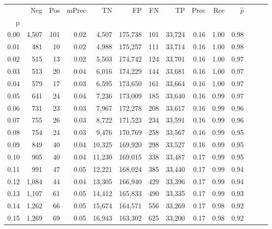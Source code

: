 \begin{tabular}{rrrrrrrrrrrrrr}
\toprule
{} &    Neg &    Pos & mPrec &       TN &       FP &      FN &      TP &  Prec &   Rec & $\hat{p}$ \\
p    &        &        &       &          &          &         &         &       &       &           \\
\midrule
0.00 &  4,507 &    101 &  0.02 &    4,507 &  175,738 &     101 &  33,724 &  0.16 &  1.00 &      0.98 \\
0.01 &    481 &     10 &  0.02 &    4,988 &  175,257 &     111 &  33,714 &  0.16 &  1.00 &      0.98 \\
0.02 &    515 &     13 &  0.02 &    5,503 &  174,742 &     124 &  33,701 &  0.16 &  1.00 &      0.97 \\
0.03 &    513 &     20 &  0.04 &    6,016 &  174,229 &     144 &  33,681 &  0.16 &  1.00 &      0.97 \\
0.04 &    579 &     17 &  0.03 &    6,595 &  173,650 &     161 &  33,664 &  0.16 &  1.00 &      0.97 \\
0.05 &    641 &     24 &  0.04 &    7,236 &  173,009 &     185 &  33,640 &  0.16 &  0.99 &      0.97 \\
0.06 &    731 &     23 &  0.03 &    7,967 &  172,278 &     208 &  33,617 &  0.16 &  0.99 &      0.96 \\
0.07 &    755 &     26 &  0.03 &    8,722 &  171,523 &     234 &  33,591 &  0.16 &  0.99 &      0.96 \\
0.08 &    754 &     24 &  0.03 &    9,476 &  170,769 &     258 &  33,567 &  0.16 &  0.99 &      0.95 \\
0.09 &    849 &     40 &  0.04 &   10,325 &  169,920 &     298 &  33,527 &  0.16 &  0.99 &      0.95 \\
0.10 &    905 &     40 &  0.04 &   11,230 &  169,015 &     338 &  33,487 &  0.17 &  0.99 &      0.95 \\
0.11 &    991 &     47 &  0.05 &   12,221 &  168,024 &     385 &  33,440 &  0.17 &  0.99 &      0.94 \\
0.12 &  1,084 &     44 &  0.04 &   13,305 &  166,940 &     429 &  33,396 &  0.17 &  0.99 &      0.94 \\
0.13 &  1,107 &     61 &  0.05 &   14,412 &  165,833 &     490 &  33,335 &  0.17 &  0.99 &      0.93 \\
0.14 &  1,262 &     66 &  0.05 &   15,674 &  164,571 &     556 &  33,269 &  0.17 &  0.98 &      0.92 \\
0.15 &  1,269 &     69 &  0.05 &   16,943 &  163,302 &     625 &  33,200 &  0.17 &  0.98 &      0.92 \\

\end{tabular}
